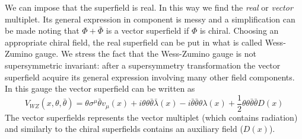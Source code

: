 \begin{appendices}
We can impose that the superfield is real. In this way we find the 
\emph{real} or \emph{vector} multiplet.
Its general expression in component is messy and a simplification can be made noting that $\Phi + \bar{\Phi}$ is a vector superfield if $\Phi$ is chiral.
Choosing an appropriate chiral field, the real superfield can be put in what is called Wess-Zumino gauge. 
We stress the fact that the Wess-Zumino gauge is not supersymmetric invariant: after a supersymmetry transformation the vector superfield acquire its general expression involving many other field components.
In this gauge the vector superfield can be written as 
\begin{equation}
 V_{WZ} (x, \theta,\bar{\theta}) = \theta \sigma^{\mu} \bar{\theta} v_{\mu} (x) + i \theta\theta \bar{\theta} \bar{\lambda} (x) - i \bar{\theta} \bar{\theta} \theta \lambda(x) + \frac{1}{2} \theta \theta \bar{\theta} \bar{\theta} D(x)
\end{equation}
The vector superfields represents the vector multiplet (which contains radiation) and similarly to the chiral superfields contains an auxiliary field ($D(x)$).
  
















\end{appendices}
